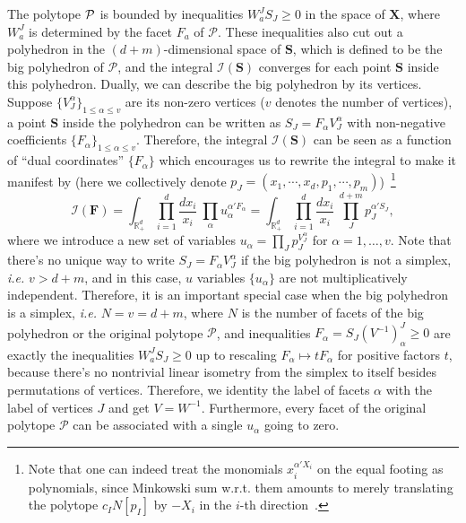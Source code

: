 \documentclass[hidelinks,12pt]{article}
\begin{document}
The polytope ${\cal P}$ is bounded by inequalities $W_a^JS_J\geq 0$ in the space of $\mathbf X$, where $W_a^J$ is determined by the facet $F_a$ of $\mathcal P$.  These inequalities also cut out a polyhedron in the $(d+m)$-dimensional space of $\mathbf S$, which is defined to be the big polyhedron of $\mathcal P$, 
and the integral $\mathcal I(\mathbf S)$ converges for each point $\mathbf S$ 
inside this polyhedron. Dually, we can describe the big polyhedron by its vertices. Suppose 
$\{V_J^\alpha\}_{1\leq \alpha \leq v}$ are its non-zero vertices ($v$ denotes the number of vertices), a point $\mathbf S$ inside 
the polyhedron can be written as $S_J = F_\alpha V^\alpha_J$ with non-negative coefficients 
$\{F_\alpha\}_{1\leq \alpha \leq v}$.  Therefore, the integral $\mathcal I(\mathbf S)$
can be seen as a function of ``dual coordinates'' $\{F_\alpha\}$ which encourages us to 
rewrite the integral to make it manifest by (here we collectively denote $p_J=(x_1, \cdots, x_d, p_1, \cdots, p_m)$)~\footnote{Note that one can indeed treat the monomials $x_i^{\alpha' X_i}$ on the equal footing as polynomials, since Minkowski sum w.r.t. them amounts to merely translating the polytope $c_I N[p_I]$ by $-X_i$ in the $i$-th direction~\cite{Arkani-Hamed:2019mrd}.}
\begin{equation}
	\mathcal I(\mathbf F)=
	\int_{\mathbb R_+^d} \prod_{i=1}^d \frac{d x_i}{x_i}~%
	\prod_{\alpha}u_\alpha^{\alpha' F_\alpha}
	=
	\int_{\mathbb R_+^d}\prod_{i=1}^d \frac{d x_i}{x_i}~%
	\prod_{J}^{d{+}m} p_J^{\alpha' S_J},
\end{equation}
where we introduce a new set of variables $u_\alpha = \prod_J p_J^{V_J^\alpha}$ for 
$\alpha=1,\dots, v$. Note that there's no unique way to write $S_J=F_\alpha V_J^\alpha$ if the big polyhedron is not a simplex, \textit{i.e.} $v>d+m$, and in this case,
$u$ variables $\{u_\alpha \}$ are not multiplicatively independent. Therefore, it is an important special case when the big polyhedron is a simplex, \textit{i.e.} $N=v=d+m$, where $N$ is 
the number of facets of the big polyhedron or the original polytope $\mathcal P$,
and inequalities $F_\alpha=S_J(V^{-1})^J_\alpha \geq 0$ are exactly the inequalities $W_a^J S_J\geq 0$ up to rescaling $F_\alpha \mapsto t F_\alpha$ for positive factors $t$, because
there's no nontrivial linear isometry from the simplex to itself besides permutations of vertices. Therefore, we identity the label of facets $\alpha$ with the label of 
vertices $J$ and get $V=W^{-1}$. Furthermore, every facet of the original polytope $\mathcal P$ can be associated with a single $u_\alpha$ going to zero. 
\end{document}
